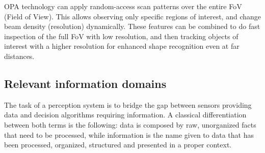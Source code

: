 \documentclass[journal]{IEEEtran}
\begin{document}
OPA technology can apply random-access scan patterns over the entire FoV 
(Field of View). This allows observing only specific regions of interest, and
change beam density (resolution) dynamically. 
These features can be combined to do fast inspection of the full FoV with low
resolution, and then tracking objects of interest with a higher resolution for 
enhanced shape recognition even at far distances.

\subsection{Relevant information domains}
\label{sec:03-d-information-domains}

The task of a perception system is to bridge the gap between sensors providing 
data and decision algorithms requiring information.
A classical differentiation between both terms is the following: data is 
composed by raw, unorganized facts that need to be processed, while  
information is the name given to data that has been processed, organized, 
structured and presented in a proper context.
\end{document}
